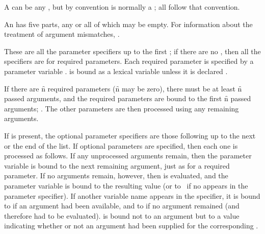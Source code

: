 A  can be any , 
but by convention is normally a ;
all   follow that convention.

An  has five parts, any or all of which may be empty.
For information about the treatment of argument mismatches,
\seesection\FuncallErrorChecking.


     
These are all the parameter specifiers up to 
the first ;
if there are no , 
then all the specifiers are for required parameters.
Each required parameter is specified by a parameter variable .
 is bound as a lexical variable unless it is declared .

If there are \f{n} required parameters (\f{n} may be zero), 
there must be at least \f{n} passed arguments, and the 
required parameters are bound to the first \f{n} passed arguments;
\seesection\FuncallErrorChecking.
The other parameters are then processed using any remaining arguments.

\endsubsubsection%



If  is present,
the optional parameter specifiers are those following 
up to the next  or the end of the list.
If optional parameters are specified, then each one is processed as
follows.  If any unprocessed arguments remain, then the parameter variable
 is bound to the next remaining argument, just as for a required
parameter.  If no arguments remain, however, then  
is evaluated, and the parameter variable
is bound to the resulting value 
(or to \nil\ if no  appears
in the parameter specifier).
If another variable name  
appears in the specifier, it is bound
to  if an argument had been available, and to  if no
argument remained (and therefore  had to be evaluated).
is bound not to an argument but to a value indicating whether or not
an argument had been supplied for the corresponding .

